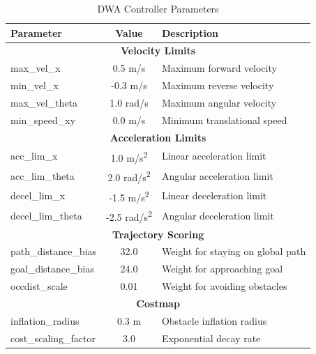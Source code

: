 \begin{table}[H]
\centering
\caption{DWA Controller Parameters}
\begin{tabular}{|l|c|l|}
\hline
\textbf{Parameter} & \textbf{Value} & \textbf{Description} \\
\hline
\multicolumn{3}{|c|}{\textbf{Velocity Limits}} \\
\hline
max\_vel\_x & 0.5 m/s & Maximum forward velocity \\
\hline
min\_vel\_x & -0.3 m/s & Maximum reverse velocity \\
\hline
max\_vel\_theta & 1.0 rad/s & Maximum angular velocity \\
\hline
min\_speed\_xy & 0.0 m/s & Minimum translational speed \\
\hline
\multicolumn{3}{|c|}{\textbf{Acceleration Limits}} \\
\hline
acc\_lim\_x & 1.0 m/s\textsuperscript{2} & Linear acceleration limit \\
\hline
acc\_lim\_theta & 2.0 rad/s\textsuperscript{2} & Angular acceleration limit \\
\hline
decel\_lim\_x & -1.5 m/s\textsuperscript{2} & Linear deceleration limit \\
\hline
decel\_lim\_theta & -2.5 rad/s\textsuperscript{2} & Angular deceleration limit \\
\hline
\multicolumn{3}{|c|}{\textbf{Trajectory Scoring}} \\
\hline
path\_distance\_bias & 32.0 & Weight for staying on global path \\
\hline
goal\_distance\_bias & 24.0 & Weight for approaching goal \\
\hline
occdist\_scale & 0.01 & Weight for avoiding obstacles \\
\hline
\multicolumn{3}{|c|}{\textbf{Costmap}} \\
\hline
inflation\_radius & 0.3 m & Obstacle inflation radius \\
\hline
cost\_scaling\_factor & 3.0 & Exponential decay rate \\
\hline
\end{tabular}
\end{table}

